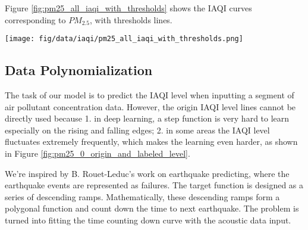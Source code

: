 \documentclass[
twocolumn,
]{ceurart}
\begin{document}
Figure \ref{fig:pm25_all_iaqi_with_thresholds} shows the IAQI curves corresponding to $PM_{2.5}$, with thresholds lines.

\begin{figure*}[!htbp]
    \begin{center}
        \texttt{[image: fig/data/iaqi/pm25\_all\_iaqi\_with\_thresholds.png]}
    \end{center}
    \caption{All $PM_{2.5}$ data with IAQI thresholds.}
    \label{fig:pm25_all_iaqi_with_thresholds}
\end{figure*}

\subsection{Data Polynomialization}

The task of our model is to predict the IAQI level when inputting a segment of air pollutant concentration data. However, the origin IAQI level lines cannot be directly used because 1. in deep learning, a step function is very hard to learn especially on the rising and falling edges; 2. in some areas the IAQI level fluctuates extremely frequently, which makes the learning even harder, as shown in Figure \ref{fig:pm25_0_origin_and_labeled_level}.


We're inspired by B. Rouet-Leduc's work \cite{rouet2017machine} on earthquake predicting, where the earthquake events are represented as failures. The target function is designed as a series of descending ramps. Mathematically, these descending ramps form a polygonal function and count down the time to next earthquake. The problem is turned into fitting the time counting down curve with the acoustic data input.
\end{document}
